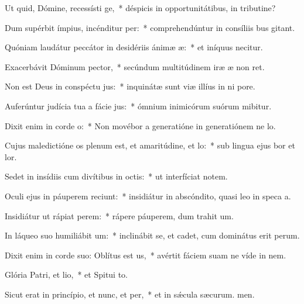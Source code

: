 \item Ut quid, Dómine, recessísti ge,~* déspicis in opportunitátibus, in tributine?
\item Dum supérbit ímpius, incénditur per:~* comprehendúntur in consíliis bus gitant.
\item Quóniam laudátur peccátor in desidériis ánimæ æ:~* et iníquus necitur.
\item Exacerbávit Dóminum pector,~* secúndum multitúdinem iræ æ non ret.
\item Non est Deus in conspéctu jus:~* inquinátæ sunt viæ illíus in ni pore.
\item Auferúntur judícia tua a fácie jus:~* ómnium inimicórum suórum mibitur.
\item Dixit enim in corde o:~* Non movébor a generatióne in generatiónem ne lo.
\item Cujus maledictióne os plenum est, et amaritúdine, et lo:~* sub lingua ejus bor et lor.
\item Sedet in insídiis cum divítibus in octis:~* ut interfíciat notem.
\item Oculi ejus in páuperem reciunt:~* insidiátur in abscóndito, quasi leo in speca a.
\item Insidiátur ut rápiat perem:~* rápere páuperem, dum trahit um.
\item In láqueo suo humiliábit um:~* inclinábit se, et cadet, cum dominátus erit perum.
\item Dixit enim in corde suo: Oblítus est us,~* avértit fáciem suam ne víde in nem.
\item Glória Patri, et lio,~* et Spitui to.
\item Sicut erat in princípio, et nunc, et per,~* et in sǽcula sæcurum. men.
